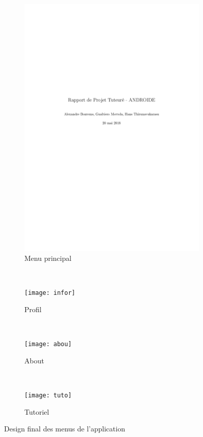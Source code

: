 \documentclass[../main.tex]{subfiles}
\begin{document}
\begin{figure}[ht!]
    \centering
    \begin{subfigure}{0.34\textwidth}
        \centering
        \includegraphics[width=\linewidth]{main}
        \caption{Menu principal}
    \end{subfigure}
    ~
    \begin{subfigure}{0.34\textwidth}
        \centering
        \texttt{[image: infor]}
        \caption{Profil}
    \end{subfigure}
    ~
    \begin{subfigure}{0.34\textwidth}
        \centering
        \texttt{[image: abou]}
        \caption{About}
    \end{subfigure}
    ~
    \begin{subfigure}{0.34\textwidth}
        \centering
        \texttt{[image: tuto]}
        \caption{Tutoriel}
    \end{subfigure}
    \caption{Design final des menus de l'application}
    \label{fig-screen1}
\end{figure}
 
\end{document}
